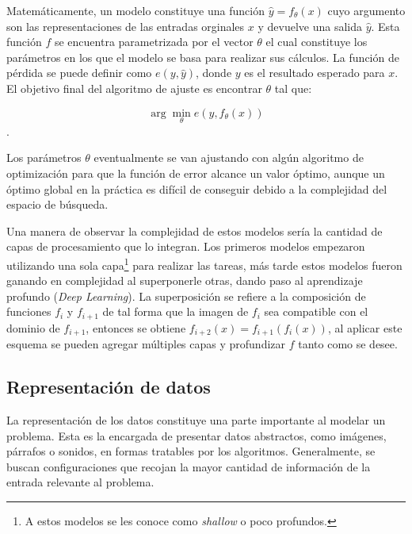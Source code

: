 Matemáticamente, un modelo constituye una función $\hat{y} = f_{\theta}(x)$ cuyo argumento son las 
representaciones de las entradas orginales $x$ y devuelve una salida $\hat{y}$. Esta función $f$ se encuentra
parametrizada por el vector $\theta$ el cual constituye los parámetros en los que el modelo se basa para realizar sus
cálculos. La función de pérdida se puede definir como $e(y, \hat{y})$, donde $y$ es el resultado esperado para $x$. 
El objetivo final del algoritmo de ajuste es encontrar $\theta$ tal que:

\begin{equation}
	\arg \min_{\theta} e(y, f_{\theta}(x))
\end{equation}\label{eq:arg_min_theta}.

Los parámetros $\theta$ eventualmente se van ajustando con algún algoritmo de optimización para que 
la función de error alcance un valor óptimo, aunque un óptimo global en la práctica es difícil de conseguir
debido a la complejidad del espacio de búsqueda.

Una manera de observar la complejidad de estos modelos sería la cantidad de capas de procesamiento que lo integran.
Los primeros modelos empezaron utilizando una sola capa\footnote{A estos modelos se les conoce 
como \emph{shallow} o poco profundos.} para realizar 
las tareas, más tarde estos modelos fueron ganando en complejidad al superponerle otras, dando paso al 
aprendizaje profundo (\emph{Deep Learning}). La superposición se refiere
a la composición de funciones $f_i$ y $f_{i+1}$ de tal forma que la imagen de $f_i$ sea compatible con el dominio de 
$f_{i+1}$, entonces se obtiene $f_{i+2}(x) = f_{i+1}(f_i(x))$, al aplicar este esquema se pueden agregar múltiples
capas y profundizar $f$ tanto como se desee.


\subsection{Representación de datos}

La representación de los datos constituye una parte importante al modelar un problema. Esta 
es la encargada de presentar datos abstractos, como imágenes, párrafos o sonidos, en formas tratables
por los algoritmos. Generalmente, se buscan configuraciones que recojan la mayor cantidad de información 
de la entrada relevante al problema.

